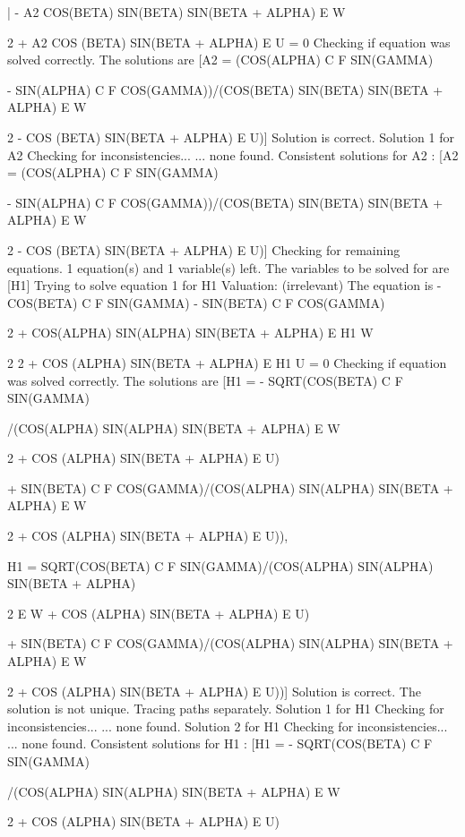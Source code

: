 \begin{literatim}{|}
 - A2 COS(BETA) SIN(BETA) SIN(BETA + ALPHA) E W

         2
 + A2 COS (BETA) SIN(BETA + ALPHA) E U = 0
Checking if equation was solved correctly.
The solutions are [A2 = (COS(ALPHA) C F SIN(GAMMA)

 - SIN(ALPHA) C F COS(GAMMA))/(COS(BETA) SIN(BETA) SIN(BETA + ALPHA) E W

      2
 - COS (BETA) SIN(BETA + ALPHA) E U)]
Solution is correct.
Solution 1 for A2
Checking for inconsistencies...
... none found.
Consistent solutions for A2 : [A2 = (COS(ALPHA) C F SIN(GAMMA)

 - SIN(ALPHA) C F COS(GAMMA))/(COS(BETA) SIN(BETA) SIN(BETA + ALPHA) E W

      2
 - COS (BETA) SIN(BETA + ALPHA) E U)]
Checking for remaining equations.
1 equation(s) and 1 variable(s) left.
The variables to be solved for are [H1]
Trying to solve equation 1 for H1
Valuation: (irrelevant)
The equation is - COS(BETA) C F SIN(GAMMA) - SIN(BETA) C F COS(GAMMA)

                                               2
 + COS(ALPHA) SIN(ALPHA) SIN(BETA + ALPHA) E H1  W

      2                                     2
 + COS (ALPHA) SIN(BETA + ALPHA) E H1  U = 0
Checking if equation was solved correctly.
The solutions are [H1 = - SQRT(COS(BETA) C F SIN(GAMMA)

/(COS(ALPHA) SIN(ALPHA) SIN(BETA + ALPHA) E W

      2
 + COS (ALPHA) SIN(BETA + ALPHA) E U)

 + SIN(BETA) C F COS(GAMMA)/(COS(ALPHA) SIN(ALPHA) SIN(BETA + ALPHA) E W

      2
 + COS (ALPHA) SIN(BETA + ALPHA) E U)), 

H1 = SQRT(COS(BETA) C F SIN(GAMMA)/(COS(ALPHA) SIN(ALPHA) SIN(BETA + ALPHA)

          2
 E W + COS (ALPHA) SIN(BETA + ALPHA) E U)

 + SIN(BETA) C F COS(GAMMA)/(COS(ALPHA) SIN(ALPHA) SIN(BETA + ALPHA) E W

      2
 + COS (ALPHA) SIN(BETA + ALPHA) E U))]
Solution is correct.
The solution is not unique. Tracing paths separately.
Solution 1 for H1
Checking for inconsistencies...
... none found.
Solution 2 for H1
Checking for inconsistencies...
... none found.
Consistent solutions for H1 : [H1 = - SQRT(COS(BETA) C F SIN(GAMMA)

/(COS(ALPHA) SIN(ALPHA) SIN(BETA + ALPHA) E W

      2
 + COS (ALPHA) SIN(BETA + ALPHA) E U)


\end{literatim}
